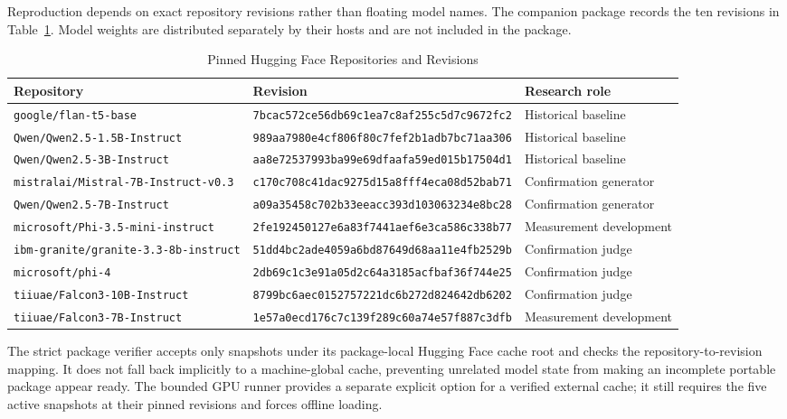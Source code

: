 \documentclass[conference]{IEEEtran}
\begin{document}
Reproduction depends on exact repository revisions rather than floating model names. The companion package records the ten revisions in Table~\ref{tab:models}. Model weights are distributed separately by their hosts and are not included in the package.

\begin{table}[!t]
\centering
\caption{Pinned Hugging Face Repositories and Revisions}
\label{tab:models}
\scriptsize
\begin{tabular}{@{}p{}p{}p{}@{}}
\toprule
\textbf{Repository} & \textbf{Revision} & \textbf{Research role} \\
\midrule
\texttt{google/flan-t5-base} & \texttt{7bcac572ce56db69c1ea7c8af255c5d7c9672fc2} & Historical baseline \\
\texttt{Qwen/Qwen2.5-1.5B-Instruct} & \texttt{989aa7980e4cf806f80c7fef2b1adb7bc71aa306} & Historical baseline \\
\texttt{Qwen/Qwen2.5-3B-Instruct} & \texttt{aa8e72537993ba99e69dfaafa59ed015b17504d1} & Historical baseline \\
\texttt{mistralai/Mistral-7B-Instruct-v0.3} & \texttt{c170c708c41dac9275d15a8fff4eca08d52bab71} & Confirmation generator \\
\texttt{Qwen/Qwen2.5-7B-Instruct} & \texttt{a09a35458c702b33eeacc393d103063234e8bc28} & Confirmation generator \\
\texttt{microsoft/Phi-3.5-mini-instruct} & \texttt{2fe192450127e6a83f7441aef6e3ca586c338b77} & Measurement development \\
\texttt{ibm-granite/granite-3.3-8b-instruct} & \texttt{51dd4bc2ade4059a6bd87649d68aa11e4fb2529b} & Confirmation judge \\
\texttt{microsoft/phi-4} & \texttt{2db69c1c3e91a05d2c64a3185acfbaf36f744e25} & Confirmation judge \\
\texttt{tiiuae/Falcon3-10B-Instruct} & \texttt{8799bc6aec0152757221dc6b272d824642db6202} & Confirmation judge \\
\texttt{tiiuae/Falcon3-7B-Instruct} & \texttt{1e57a0ecd176c7c139f289c60a74e57f887c3dfb} & Measurement development \\
\bottomrule
\end{tabular}
\end{table}

The strict package verifier accepts only snapshots under its package-local Hugging Face cache root and checks the repository-to-revision mapping. It does not fall back implicitly to a machine-global cache, preventing unrelated model state from making an incomplete portable package appear ready. The bounded GPU runner provides a separate explicit option for a verified external cache; it still requires the five active snapshots at their pinned revisions and forces offline loading.
\end{document}
